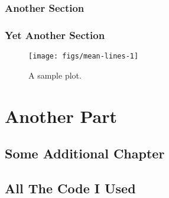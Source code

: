 \documentclass[
    numbers=noenddot,
    open=any,
    paper=a4,
    oneside,
    pagesize,
    captions=tableabove,
    bibliography=totoc,
    11pt
    ]{scrbook}
\begin{document}
\begin{table}[!h]

\caption{\label{tab:report}Data overview.}
\centering
{}
\end{table}

\hypertarget{another-section}{%
\section{Another Section}\label{another-section}}

\hypertarget{yet-another-section}{%
\section{Yet Another Section}\label{yet-another-section}}

\begin{figure}

{\centering \texttt{[image: figs/mean-lines-1]} 

}

\caption{A sample plot.}\label{fig:mean-lines}
\end{figure}

\hypertarget{another-part}{%
\part{Another Part}\label{another-part}}

\hypertarget{some-additional-chapter}{%
\chapter{Some Additional Chapter}\label{some-additional-chapter}}

\textcite{tarski1944semantic}

\textcite{dayal2009variation}

\hypertarget{all-the-code-i-used}{%
\chapter*{All The Code I Used}\label{all-the-code-i-used}}
\end{document}

